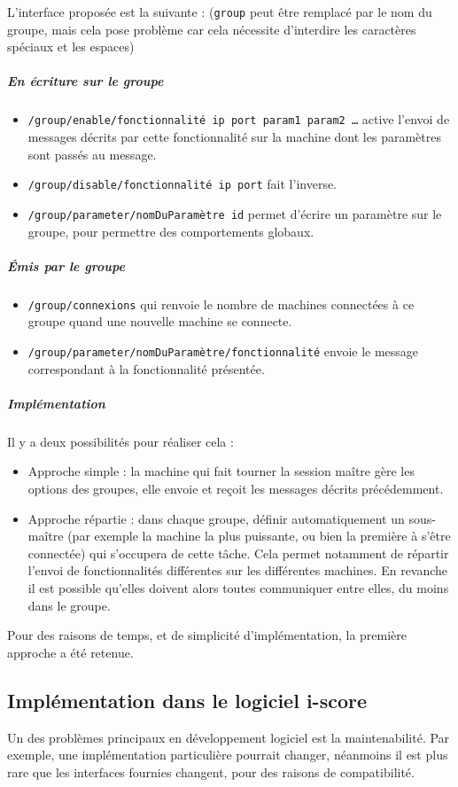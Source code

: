 L'interface proposée est la suivante : (\texttt{group} peut être remplacé par le nom du groupe, mais cela pose problème car cela nécessite d'interdire les caractères spéciaux et les espaces)

\subparagraph{En écriture sur le groupe} 
\begin{itemize}
	\item \texttt{/group/enable/fonctionnalité ip port param1 param2 \dots} active l'envoi de messages décrits par cette fonctionnalité sur la machine dont les paramètres sont passés au message.
	\item \texttt{/group/disable/fonctionnalité ip port} fait l'inverse.
	\item \texttt{/group/parameter/nomDuParamètre id} permet d'écrire un paramètre sur le groupe, pour permettre des comportements globaux.
\end{itemize}

\subparagraph{Émis par le groupe}
\begin{itemize}
	\item \texttt{/group/connexions} qui renvoie le nombre de machines connectées à ce groupe quand une nouvelle machine se connecte.
	\item \texttt{/group/parameter/nomDuParamètre/fonctionnalité} envoie le message correspondant à la fonctionnalité présentée.
\end{itemize}

\subparagraph{Implémentation}
Il y a deux possibilités pour réaliser cela : 
\begin{itemize}
	\item Approche simple : la machine qui fait tourner la session maître gère les options des groupes, elle envoie et reçoit les messages décrits précédemment.
	\item Approche répartie : dans chaque groupe, définir automatiquement un sous-maître (par exemple la machine la plus puissante, ou bien la première à s'être connectée) qui s'occupera de cette tâche. Cela permet notamment de répartir l'envoi de fonctionnalités différentes sur les différentes machines. En revanche il est possible qu'elles doivent alors toutes communiquer entre elles, du moins dans le groupe.
\end{itemize}

Pour des raisons de temps, et de simplicité d'implémentation, la première approche a été retenue.

\subsection{Implémentation dans le logiciel i-score}
Un des problèmes principaux en développement logiciel est la maintenabilité. Par exemple, une implémentation particulière pourrait changer, néanmoins il est plus rare que les interfaces fournies changent, pour des raisons de compatibilité.


